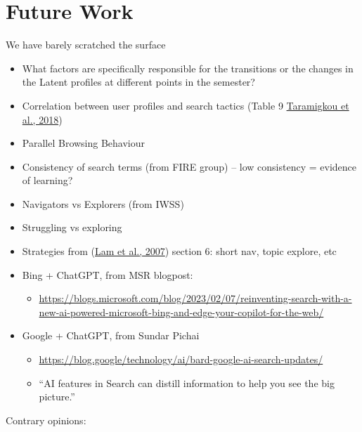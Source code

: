 \documentclass[letterpaper, nobind]{templates/ociamthesis}
\providecommand{\tightlist}{%
  \setlength{\itemsep}{0pt}\setlength{\parskip}{0pt}}
\begin{document}
\hypertarget{future-work}{%
\section{Future Work}\label{future-work}}

We have barely scratched the surface

\begin{itemize}
\tightlist
\item
  What factors are specifically responsible for the transitions or the changes in the Latent profiles at different points in the semester?
\item
  Correlation between user profiles and search tactics (Table 9 \protect\hyperlink{ref-taramigkou2018leveraging}{Taramigkou et al., 2018})
\item
  Parallel Browsing Behaviour
\item
  Consistency of search terms (from FIRE group) -- low consistency = evidence of learning?
\item
  Navigators vs Explorers (from IWSS)
\item
  Struggling vs exploring
\item
  Strategies from (\protect\hyperlink{ref-lam2007session}{Lam et al., 2007}) section 6: short nav, topic explore, etc
\item
  Bing + ChatGPT, from MSR blogpost:

  \begin{itemize}
  \tightlist
  \item
    \url{https://blogs.microsoft.com/blog/2023/02/07/reinventing-search-with-a-new-ai-powered-microsoft-bing-and-edge-your-copilot-for-the-web/}
  \end{itemize}
\item
  Google + ChatGPT, from Sundar Pichai

  \begin{itemize}
  \tightlist
  \item
    \url{https://blog.google/technology/ai/bard-google-ai-search-updates/}
  \item
    ``AI features in Search can distill information to help you see the big picture.''
  \end{itemize}
\end{itemize}

Contrary opinions:
\end{document}
